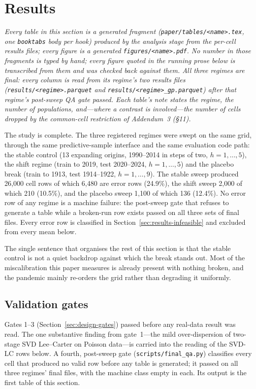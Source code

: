 \section{Results}
\label{sec:results}

\noindent\textit{Every table in this section is a generated fragment
(\texttt{paper/tables/<name>.tex}, one \texttt{booktabs} body per hook)
produced by the analysis stage from the per-cell results files; every
figure is a generated \texttt{figures/<name>.pdf}. No number in those
fragments is typed by hand; every figure quoted in the running prose below
is transcribed from them and was checked back against them. All three
regimes are final: every column is
read from its regime's two results files
(\texttt{results/<regime>.parquet} and
\texttt{results/<regime>\_gp.parquet}) after that regime's post-sweep QA
gate passed. Each table's note states the regime, the number of
populations, and---where a contrast is involved---the number of cells
dropped by the common-cell restriction of Addendum~3 (\S11).}

The study is complete. The three registered regimes were swept on the
same grid, through the same predictive-sample interface and the same
evaluation code path: the stable control (13 expanding origins,
1990--2014 in steps of two, $h=1,\dots,5$), the shift regime (train to
2019, test 2020--2024, $h=1,\dots,5$) and the placebo break (train to
1913, test 1914--1922, $h=1,\dots,9$). The stable sweep produced 26{,}000
cell rows of which 6{,}480 are error rows (24.9\%), the shift sweep 2{,}000
of which 210 (10.5\%), and the placebo sweep 1{,}100 of which 136
(12.4\%). No error row of any regime is a machine failure: the post-sweep
gate that refuses to generate a table while a broken-run row exists passed
on all three sets of final files. Every error row is classified in
Section~\ref{sec:results-infeasible} and excluded from every mean below.

The single sentence that organises the rest of this section is that the
stable control is not a quiet backdrop against which the break stands out.
Most of the miscalibration this paper measures is already present with
nothing broken, and the pandemic mainly re-orders the grid rather than
degrading it uniformly.

\subsection{Validation gates}

Gates 1--3 (Section~\ref{sec:design-gates}) passed before any real-data
result was read. The one substantive finding from gate~1---the mild
over-dispersion of two-stage SVD Lee--Carter on Poisson data---is carried
into the reading of the SVD-LC rows below. A fourth, post-sweep gate
(\texttt{scripts/final\_qa.py}) classifies every cell that produced no
valid row before any table is generated; it passed on all three regimes'
final files, with the machine class empty in each. Its output is the first
table of this section.

